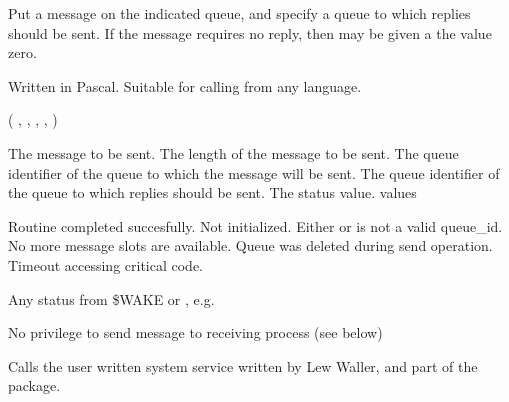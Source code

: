 \begin{appendix}
\begin{manroutinedescription}
      Put a message on the indicated queue, and specify a queue
      to which replies should be sent. If the message requires
      no reply, then  {} may be given a the value zero.

      Written in Pascal. Suitable for calling from any language.

      {} {\mantt{=}} {} ( {}, {}, {},
           {}, {} )

\begin{manparametertable}
                          The message to be sent.
                          The length of the message to be sent.
                          The queue identifier of the queue to
                          which the message will be sent.
                          The queue identifier of the queue to
                          which replies should be sent.
 The status %
value.
      {} values
\end{manparametertable}
\begin{mantwocolumntable}
  Routine completed succesfully.
  {} Not initialized.
  Either {} or %
{} is
                          not a valid queue\_id.
 No more message slots are %
available.
  Queue was deleted during send %
operation.
  Timeout accessing critical code.
\end{mantwocolumntable}
          Any status from \$WAKE or {}, e.g.
\begin{mantwocolumntable}
 No privilege to send message to
                          receiving process (see below)
\end{mantwocolumntable}
      Calls the user written system service {} written by
      Lew Waller, and part of the {} package.


\end{manroutinedescription}
\end{appendix}
